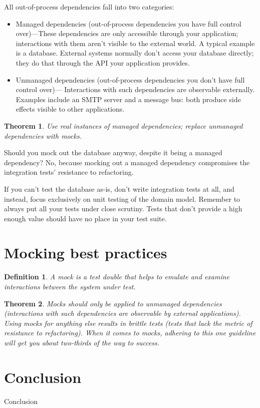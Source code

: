 \documentclass{article}
\newtheorem{definition}{Definition}
\newtheorem{theorem}{Theorem}
\begin{document}
All out-of-process dependencies fall into two categories:
\begin{itemize}
	\item  Managed dependencies (out-of-process dependencies you have full control over)—These dependencies are only accessible through your application; interactions with them aren’t visible to the external world. A typical example is a database. External systems normally don’t access your database directly; they do that through
the API your application provides.
	\item Unmanaged dependencies (out-of-process dependencies you don’t have full control over)— Interactions with such dependencies are observable externally. Examples include an SMTP server and a message bus: both produce side effects visible to other
applications.
\end{itemize}

\begin{theorem}
Use real instances of managed dependencies; replace unmanaged dependencies with mocks.
\end{theorem}

Should you mock out the database anyway, despite it being a managed dependency? No, because mocking out a managed dependency compromises the integration tests’ resistance to refactoring.

If you can’t test the database as-is, don’t write integration tests at all, and instead, focus exclusively on unit testing of the domain model. Remember to always put all your tests under close scrutiny. Tests that don’t provide a high enough value should have no place in your test suite.

\section{Mocking best practices}

\begin{definition}
A mock is a test double that helps to emulate and examine interactions between the system under test.
\end{definition}

\begin{theorem}
Mocks should only be applied to unmanaged dependencies (interactions with such dependencies are observable by external applications). Using mocks for anything else results in brittle tests (tests that lack the metric of resistance to refactoring). When it comes to mocks, adhering to this one guideline will get you about two-thirds of the way to success.
\end{theorem}


\section{Conclusion}

Conclusion


\newpage

 

\end{document}
